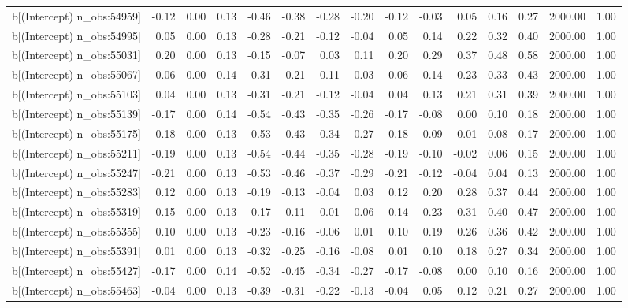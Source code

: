 \begin{table}[ht]
\begin{tabular}{rrrrrrrrrrrrrrr}
  b[(Intercept) n\_obs:54959] & -0.12 & 0.00 & 0.13 & -0.46 & -0.38 & -0.28 & -0.20 & -0.12 & -0.03 & 0.05 & 0.16 & 0.27 & 2000.00 & 1.00 \\ 
  b[(Intercept) n\_obs:54995] & 0.05 & 0.00 & 0.13 & -0.28 & -0.21 & -0.12 & -0.04 & 0.05 & 0.14 & 0.22 & 0.32 & 0.40 & 2000.00 & 1.00 \\ 
  b[(Intercept) n\_obs:55031] & 0.20 & 0.00 & 0.13 & -0.15 & -0.07 & 0.03 & 0.11 & 0.20 & 0.29 & 0.37 & 0.48 & 0.58 & 2000.00 & 1.00 \\ 
  b[(Intercept) n\_obs:55067] & 0.06 & 0.00 & 0.14 & -0.31 & -0.21 & -0.11 & -0.03 & 0.06 & 0.14 & 0.23 & 0.33 & 0.43 & 2000.00 & 1.00 \\ 
  b[(Intercept) n\_obs:55103] & 0.04 & 0.00 & 0.13 & -0.31 & -0.21 & -0.12 & -0.04 & 0.04 & 0.13 & 0.21 & 0.31 & 0.39 & 2000.00 & 1.00 \\ 
  b[(Intercept) n\_obs:55139] & -0.17 & 0.00 & 0.14 & -0.54 & -0.43 & -0.35 & -0.26 & -0.17 & -0.08 & 0.00 & 0.10 & 0.18 & 2000.00 & 1.00 \\ 
  b[(Intercept) n\_obs:55175] & -0.18 & 0.00 & 0.13 & -0.53 & -0.43 & -0.34 & -0.27 & -0.18 & -0.09 & -0.01 & 0.08 & 0.17 & 2000.00 & 1.00 \\ 
  b[(Intercept) n\_obs:55211] & -0.19 & 0.00 & 0.13 & -0.54 & -0.44 & -0.35 & -0.28 & -0.19 & -0.10 & -0.02 & 0.06 & 0.15 & 2000.00 & 1.00 \\ 
  b[(Intercept) n\_obs:55247] & -0.21 & 0.00 & 0.13 & -0.53 & -0.46 & -0.37 & -0.29 & -0.21 & -0.12 & -0.04 & 0.04 & 0.13 & 2000.00 & 1.00 \\ 
  b[(Intercept) n\_obs:55283] & 0.12 & 0.00 & 0.13 & -0.19 & -0.13 & -0.04 & 0.03 & 0.12 & 0.20 & 0.28 & 0.37 & 0.44 & 2000.00 & 1.00 \\ 
  b[(Intercept) n\_obs:55319] & 0.15 & 0.00 & 0.13 & -0.17 & -0.11 & -0.01 & 0.06 & 0.14 & 0.23 & 0.31 & 0.40 & 0.47 & 2000.00 & 1.00 \\ 
  b[(Intercept) n\_obs:55355] & 0.10 & 0.00 & 0.13 & -0.23 & -0.16 & -0.06 & 0.01 & 0.10 & 0.19 & 0.26 & 0.36 & 0.42 & 2000.00 & 1.00 \\ 
  b[(Intercept) n\_obs:55391] & 0.01 & 0.00 & 0.13 & -0.32 & -0.25 & -0.16 & -0.08 & 0.01 & 0.10 & 0.18 & 0.27 & 0.34 & 2000.00 & 1.00 \\ 
  b[(Intercept) n\_obs:55427] & -0.17 & 0.00 & 0.14 & -0.52 & -0.45 & -0.34 & -0.27 & -0.17 & -0.08 & 0.00 & 0.10 & 0.16 & 2000.00 & 1.00 \\ 
  b[(Intercept) n\_obs:55463] & -0.04 & 0.00 & 0.13 & -0.39 & -0.31 & -0.22 & -0.13 & -0.04 & 0.05 & 0.12 & 0.21 & 0.27 & 2000.00 & 1.00 \\ 

\end{tabular}
\end{table}
